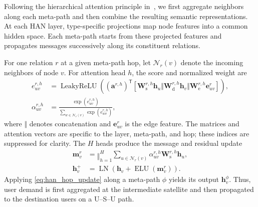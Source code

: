 Following the hierarchical attention principle
in~\cite{wang2019han}, we first aggregate neighbors along
each meta-path and then combine the resulting semantic
representations. At each HAN layer, type-specific projections
map node features into a common hidden space. Each meta-path
starts from these projected features and propagates messages
successively along its constituent relations.

For one relation $r$ at a given meta-path hop, let
$\mathcal{N}_r(v)$ denote the incoming neighbors of node $v$.
For attention head $h$, the score and normalized weight are
\begin{equation}
\begin{aligned}
e_{uv}^{r,h}
&=\operatorname{LeakyReLU}
\left(
(\mathbf{a}^{r,h})^{\mathsf T}
\left[
\mathbf{W}_{\mathrm s}^{r,h}\mathbf{h}_u
\Vert
\mathbf{W}_{\mathrm d}^{r,h}\mathbf{h}_v
\Vert
\mathbf{W}_{\mathrm e}^{r,h}\mathbf{e}_{uv}^{r}
\right]
\right),\\
\alpha_{uv}^{r,h}
&=
\frac{\exp(e_{uv}^{r,h})}
{\sum_{w\in\mathcal{N}_r(v)}
 \exp(e_{wv}^{r,h})},
\end{aligned}
\label{eq:han_relation_attention}
\end{equation}
where $\Vert$ denotes concatenation and
$\mathbf{e}_{uv}^{r}$ is the edge feature.
The matrices and attention vectors are specific to the layer,
meta-path, and hop; these indices are suppressed for clarity.
The $H$ heads produce the message and residual update
\begin{equation}
\begin{aligned}
\mathbf{m}_v^r
&=
\mathop{\Vert}_{h=1}^{H}
\sum_{u\in\mathcal{N}_r(v)}
\alpha_{uv}^{r,h}
\mathbf{W}_{\mathrm s}^{r,h}\mathbf{h}_u,\\
\mathbf{h}_v^{+}
&=
\operatorname{LN}
\left(\mathbf{h}_v+\operatorname{ELU}(\mathbf{m}_v^r)\right).
\end{aligned}
\label{eq:han_hop_update}
\end{equation}
Applying \eqref{eq:han_hop_update} along a meta-path $\phi$
yields its output $\mathbf{h}_v^\phi$.
Thus, user demand is first aggregated at the intermediate
satellite and then propagated to the destination users
on a U--S--U path.

